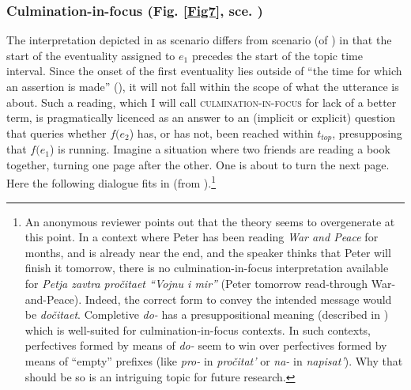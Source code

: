 \documentclass[output=paper,colorlinks,citecolor=brown]{langscibook}
\begin{document}
\subsubsection{Culmination-in-focus (Fig. \ref{Fig7}, sce. )}\label{trans}
The interpretation depicted in  as scenario  differs from scenario  (of ) in that the start of the eventuality assigned to $e_1$ precedes the start of the topic time interval.
Since the onset of the first eventuality lies outside of ``the time for which an assertion is made'' (\citealt[687]{Klein1995}), it will not fall within the scope of what the utterance is about.
Such a reading, which I will call \textsc{culmination-in-focus} for lack of a better term,
is pragmatically licenced as an answer to an (implicit or explicit) 
question that queries whether $f(e_2$) has, or has not, been reached within $t_{top}$, presupposing that $f(e_1$) is running.
Imagine a situation where two friends are reading a book together, turning one page after the other. One is about to turn the next page. Here the following dialogue fits in (from \citealt[145]{Plungjan01}).\footnote{An anonymous reviewer points out that the theory seems to overgenerate at this point. In a context where Peter has been reading \textit{War and Peace} for months, and is already near the end, and the speaker thinks that Peter will finish it tomorrow, there is no culmination-in-focus interpretation available for \textit{Petja zavtra pročitaet ``Vojnu i mir''} (Peter tomorrow read-through War-and-Peace). Indeed, the correct form to convey the intended message would be \textit{dočitaet}. Completive \textit{do-} has a presuppositional meaning (described in \citealt{Kagan15}) which is well-suited for culmination-in-focus contexts. In such contexts, perfectives formed by means of \textit{do-} seem to win over perfectives formed by means of ``empty'' prefixes (like \textit{pro-} in \textit{pročitat'} or \textit{na-} in \textit{napisat'}). Why that should be so is an intriguing topic for future research.}

\end{document}
